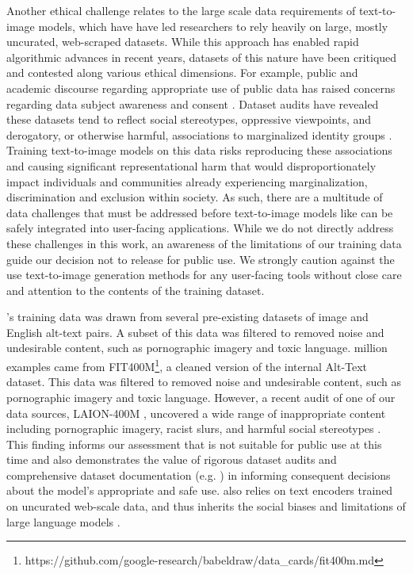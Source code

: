 Another ethical challenge relates to the large scale data requirements of text-to-image models, which have have led researchers to rely heavily on large, mostly uncurated, web-scraped datasets. 
While this approach has enabled rapid algorithmic advances in recent years, datasets of this nature have been critiqued and contested along various ethical dimensions. For example, public and academic discourse regarding appropriate use of public data has raised concerns regarding data subject awareness and consent \cite{MegaPixels, dulhantychrisIssuesComputerVision2020, Scheuerman2021DoDH, Paullada2021}. Dataset audits have revealed these datasets tend to reflect social stereotypes, oppressive viewpoints, and derogatory, or otherwise harmful, associations to marginalized identity groups \cite{prabhu2020, birhane2021laionaudit}. 
Training text-to-image models on this data risks reproducing these associations and causing significant representational harm that would disproportionately impact individuals and communities already experiencing marginalization, discrimination and exclusion within society. As such, there are a multitude of data challenges that must be addressed before text-to-image models like \name can be safely integrated into user-facing applications. While we do not directly address these challenges in this work, an awareness of the limitations of our training data guide our decision not to release \name for public use. We strongly caution against the use text-to-image generation methods for any user-facing tools without close care and attention to the contents of the training dataset. 

\name's training data was drawn from several pre-existing datasets of image and English alt-text pairs. 
\ifdefined\neuripssubmission
A subset of this data was filtered to removed noise and undesirable content, such as pornographic imagery and toxic language. 
 million examples came from FIT400M\footnote{https://github.com/google-research/babeldraw/data_cards/fit400m.md}, a cleaned version of the internal Alt-Text dataset. This data was filtered to removed noise and undesirable content, such as pornographic imagery and toxic language. 
\fi
However, a recent audit of one of our data sources, LAION-400M \cite{schuhmann2021laion}, uncovered a wide range of inappropriate content including pornographic imagery, racist slurs, and harmful social stereotypes \cite{birhane2021laionaudit}. This finding informs our assessment that \name is not suitable for public use at this time and also demonstrates the value of rigorous dataset audits and comprehensive dataset documentation (e.g. \cite{gebruDatasheetsDatasets2020, datacards}) in informing consequent decisions about the model's appropriate and safe use. \name also relies on text encoders trained on uncurated web-scale data, and thus inherits the social biases and limitations of large language models \cite{bordia-naacl-2017, bender2021, weidinger2021}. 


